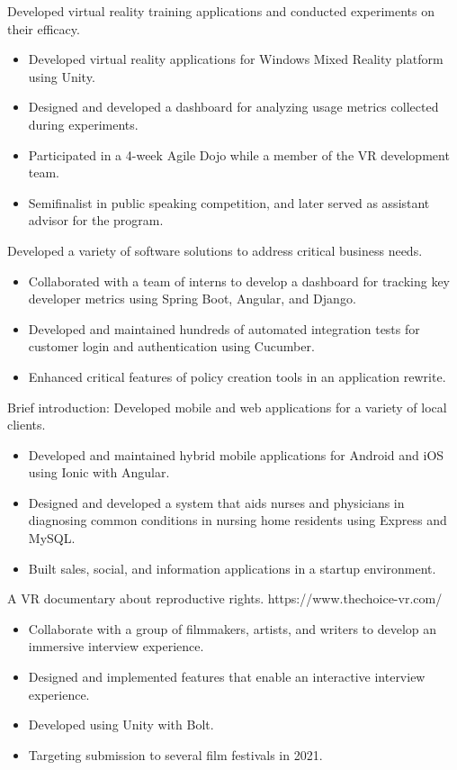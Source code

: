\documentclass{resume}
\begin{document}
Developed virtual reality training applications and conducted experiments on their efficacy.
\begin{itemize}
  \item Developed virtual reality applications for Windows Mixed Reality platform using Unity.
  \item Designed and developed a dashboard for analyzing usage metrics collected during experiments.
  \item Participated in a 4-week Agile Dojo while a member of the VR development team.
  \item Semifinalist in public speaking competition, and later served as assistant advisor for the program.
\end{itemize}

Developed a variety of software solutions to address critical business needs.
\begin{itemize}
  \item Collaborated with a team of interns to develop a dashboard for tracking key developer metrics using Spring Boot, Angular, and Django.
  \item Developed and maintained hundreds of automated integration tests for customer login and authentication using Cucumber.
  \item Enhanced critical features of policy creation tools in an application rewrite.
\end{itemize}

Brief introduction: Developed mobile and web applications for a variety of local clients.
\begin{itemize}
  \item Developed and maintained hybrid mobile applications for Android and iOS using Ionic with Angular.
  \item Designed and developed a system that aids nurses and physicians in diagnosing common conditions in nursing home residents using Express and MySQL.
  \item Built sales, social, and information applications in a startup environment.
\end{itemize}

A VR documentary about reproductive rights. https://www.thechoice-vr.com/
\begin{itemize}
  \item Collaborate with a group of filmmakers, artists, and writers to develop an immersive interview experience.
  \item Designed and implemented features that enable an interactive interview experience.
  \item Developed using Unity with Bolt.
  \item Targeting submission to several film festivals in 2021.
\end{itemize}
\end{document}
